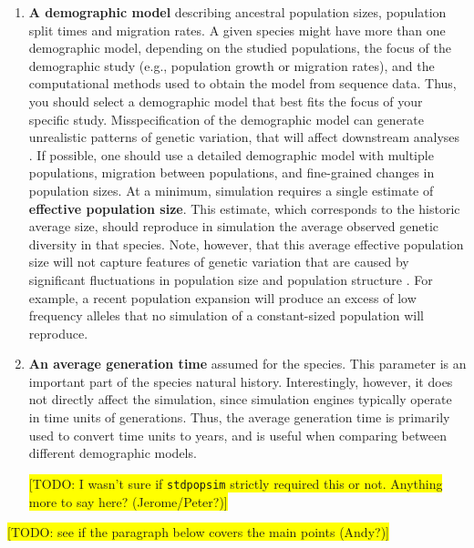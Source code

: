 \documentclass{article}
\newcommand{\stdpopsim}{\texttt{stdpopsim}\xspace}
\begin{document}
\begin{enumerate}
\item
  \textbf{A demographic model} describing ancestral population sizes, population split times and migration rates. A given species might have more than one demographic model, depending on the studied populations, the focus of the demographic study (e.g., population growth or migration rates), and the computational methods used to obtain the model from sequence data. Thus, you should select a demographic model that best fits the focus of your specific study. Misspecification of the demographic model can generate unrealistic patterns of genetic variation, that will affect downstream analyses \citep[e.g.,][]{Navascues2009}. If possible, one should use a detailed demographic model with multiple populations, migration between populations, and fine-grained changes in population sizes. At a minimum, simulation requires a single estimate of \textbf{effective population size}. This estimate, which corresponds to the historic average size, should reproduce in simulation the average observed genetic diversity in that species. Note, however, that this average effective population size will not capture features of genetic variation that are caused by significant fluctuations in population size and population structure \citep{MacLeod2013}. For example, a recent population expansion will produce
  an excess of low frequency alleles that no simulation of a constant-sized
  population will reproduce.

\item
  \textbf{An average generation time} assumed for the species. 
  This parameter is an important part of the species natural history.
  Interestingly, however, it does not directly affect the simulation, since 
  simulation engines typically operate in time units of generations. Thus, the average generation time is primarily used to convert time units to years, and is useful when comparing between different demographic models.
  
  \colorbox{yellow}{[TODO: I wasn't sure if \stdpopsim strictly required this or not. Anything more to say here? (Jerome/Peter?)]}
  
\end{enumerate}

\colorbox{yellow}{[TODO: see if the paragraph below covers the main points (Andy?)]}
\end{document}
